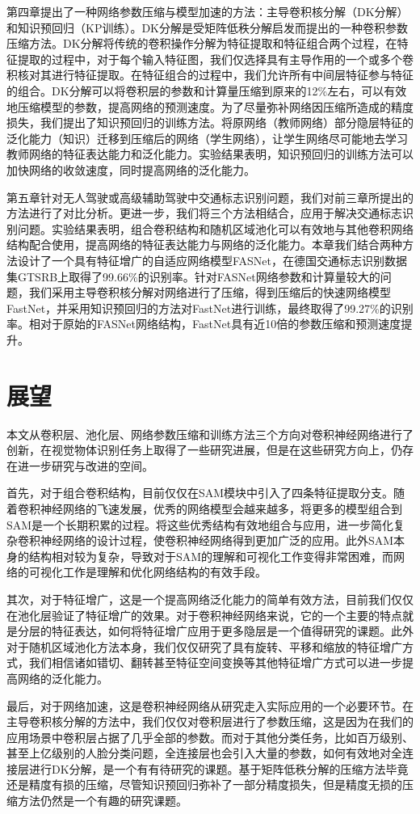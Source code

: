 第四章提出了一种网络参数压缩与模型加速的方法：主导卷积核分解（DK分解）和知识预回归（KP训练）。DK分解是受矩阵低秩分解启发而提出的一种卷积参数压缩方法。DK分解将传统的卷积操作分解为特征提取和特征组合两个过程，在特征提取的过程中，对于每个输入特征图，我们仅选择具有主导作用的一个或多个卷积核对其进行特征提取。在特征组合的过程中，我们允许所有中间层特征参与特征的组合。DK分解可以将卷积层的参数和计算量压缩到原来的12\%左右，可以有效地压缩模型的参数，提高网络的预测速度。为了尽量弥补网络因压缩所造成的精度损失，我们提出了知识预回归的训练方法。将原网络（教师网络）部分隐层特征的泛化能力（知识）迁移到压缩后的网络（学生网络），让学生网络尽可能地去学习教师网络的特征表达能力和泛化能力。实验结果表明，知识预回归的训练方法可以加快网络的收敛速度，同时提高网络的泛化能力。

第五章针对无人驾驶或高级辅助驾驶中交通标志识别问题，我们对前三章所提出的方法进行了对比分析。更进一步，我们将三个方法相结合，应用于解决交通标志识别问题。实验结果表明，组合卷积结构和随机区域池化可以有效地与其他卷积网络结构配合使用，提高网络的特征表达能力与网络的泛化能力。本章我们结合两种方法设计了一个具有特征增广的自适应网络模型FASNet，在德国交通标志识别数据集GTSRB上取得了99.66\%的识别率。针对FASNet网络参数和计算量较大的问题，我们采用主导卷积核分解对网络进行了压缩，得到压缩后的快速网络模型FastNet，并采用知识预回归的方法对FastNet进行训练，最终取得了99.27\%的识别率。相对于原始的FASNet网络结构，FastNet具有近10倍的参数压缩和预测速度提升。


\section{展望}

本文从卷积层、池化层、网络参数压缩和训练方法三个方向对卷积神经网络进行了创新，在视觉物体识别任务上取得了一些研究进展，但是在这些研究方向上，仍存在进一步研究与改进的空间。

首先，对于组合卷积结构，目前仅仅在SAM模块中引入了四条特征提取分支。随着卷积神经网络的飞速发展，优秀的网络模型会越来越多，将更多的模型组合到SAM是一个长期积累的过程。将这些优秀结构有效地组合与应用，进一步简化复杂卷积神经网络的设计过程，使卷积神经网络得到更加广泛的应用。此外SAM本身的结构相对较为复杂，导致对于SAM的理解和可视化工作变得非常困难，而网络的可视化工作是理解和优化网络结构的有效手段。

其次，对于特征增广，这是一个提高网络泛化能力的简单有效方法，目前我们仅仅在池化层验证了特征增广的效果。对于卷积神经网络来说，它的一个主要的特点就是分层的特征表达，如何将特征增广应用于更多隐层是一个值得研究的课题。此外对于随机区域池化方法本身，我们仅仅研究了具有旋转、平移和缩放的特征增广方式，我们相信诸如错切、翻转甚至特征空间变换等其他特征增广方式可以进一步提高网络的泛化能力。

最后，对于网络加速，这是卷积神经网络从研究走入实际应用的一个必要环节。在主导卷积核分解的方法中，我们仅仅对卷积层进行了参数压缩，这是因为在我们的应用场景中卷积层占据了几乎全部的参数。而对于其他分类任务，比如百万级别、甚至上亿级别的人脸分类问题，全连接层也会引入大量的参数，如何有效地对全连接层进行DK分解，是一个有有待研究的课题。基于矩阵低秩分解的压缩方法毕竟还是精度有损的压缩，尽管知识预回归弥补了一部分精度损失，但是精度无损的压缩方法仍然是一个有趣的研究课题。


